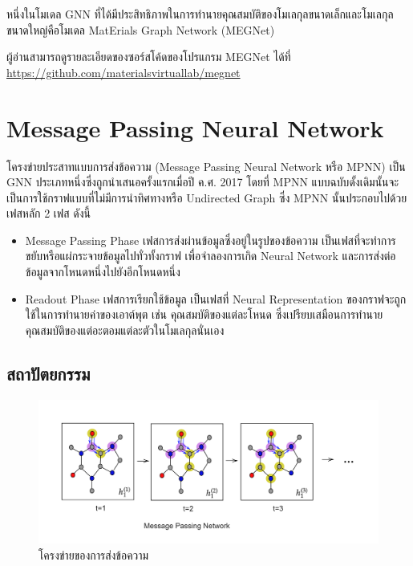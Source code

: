 หนึ่งในโมเดล GNN ที่ได้มีประสิทธิภาพในการทำนายคุณสมบัติของโมเลกุลขนาดเล็กและโมเลกุลขนาดใหญ่คือโมเดล MatErials Graph Network 
(MEGNet)\autocite{chen2019}

ผู้อ่านสามารถดูรายละเอียดของซอร์สโค้ดของโปรแกรม MEGNet ได้ที่ \url{https://github.com/materialsvirtuallab/megnet}

\section{Message Passing Neural Network}
\label{sec:mpnn}

โครงข่ายประสาทแบบการส่งข้อความ (Message Passing Neural Network หรือ MPNN) เป็น GNN ประเภทหนึ่งซึ่งถูกนำเสนอครั้งแรกเมื่อปี 
ค.ศ. 2017\autocite{gilmer2017} โดยที่ MPNN แบบฉบับดั้งเดิมนั้นจะเป็นการใช้กราฟแบบที่ไม่มีการนำทิศทางหรือ Undirected Graph
ซึ่ง MPNN นั้นประกอบไปด้วยเฟสหลัก 2 เฟส ดังนี้ 

\begin{itemize}
    \item Message Passing Phase เฟสการส่งผ่านข้อมูลซึ่งอยู่ในรูปของข้อความ เป็นเฟสที่จะทำการขยับหรือแผ่กระจายข้อมูลไปทั่วทั้งกราฟ%
    เพื่อจำลองการเกิด Neural Network และการส่งต่อข้อมูลจากโหนดหนึ่งไปยังอีกโหนดหนึ่ง
    
    \item Readout Phase เฟสการเรียกใช้ข้อมูล เป็นเฟสที่ Neural Representation ของกราฟจะถูกใช้ในการทำนายค่าของเอาต์พุต เช่น
    คุณสมบัติของแต่ละโหนด ซึ่งเปรียบเสมือนการทำนายคุณสมบัติของแต่อะตอมแต่ละตัวในโมเลกุลนั่นเอง
\end{itemize}

\subsection{สถาปัตยกรรม}
\label{ssec:mpnn_architect}

\begin{figure}[htbp]
    \centering
    \includegraphics[width=\linewidth]{fig/mp-network.png}
    \caption{โครงข่ายของการส่งข้อความ}
    \label{fig:mp_network}
\end{figure}

